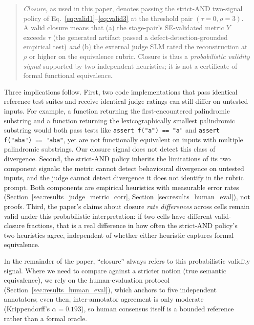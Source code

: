 \begin{quote}
\emph{Closure}, as used in this paper, denotes passing the strict-AND two-signal policy of Eq.~\ref{eq:valid1}--\ref{eq:valid3} at the threshold pair $(\tau = 0, \rho = 3)$. A valid closure means that (a) the stage-pair's SE-validated metric $Y$ exceeds $\tau$ (the generated artifact passed a defect-detection-grounded empirical test) \emph{and} (b) the external judge SLM rated the reconstruction at $\rho$ or higher on the equivalence rubric. Closure is thus a \emph{probabilistic validity signal} supported by two independent heuristics; it is not a certificate of formal functional equivalence.
\end{quote}

Three implications follow. First, two code implementations that pass identical reference test suites and receive identical judge ratings can still differ on untested inputs. For example, a function returning the first-encountered palindromic substring and a function returning the lexicographically smallest palindromic substring would both pass tests like \texttt{assert f("a") == "a"} and \texttt{assert f("aba") == "aba"}, yet are not functionally equivalent on inputs with multiple palindromic substrings. Our closure signal does not detect this class of divergence. Second, the strict-AND policy inherits the limitations of its two component signals: the metric cannot detect behavioural divergence on untested inputs, and the judge cannot detect divergence it does not identify in the rubric prompt. Both components are empirical heuristics with measurable error rates (Section~\ref{sec:results_judge_metric_corr}, Section~\ref{sec:results_human_eval}), not proofs. Third, the paper's claims about closure \emph{rate differences} across cells remain valid under this probabilistic interpretation: if two cells have different valid-closure fractions, that is a real difference in how often the strict-AND policy's two heuristics agree, independent of whether either heuristic captures formal equivalence.

In the remainder of the paper, ``closure'' always refers to this probabilistic validity signal. Where we need to compare against a stricter notion (true semantic equivalence), we rely on the human-evaluation protocol (Section~\ref{sec:results_human_eval}), which anchors to five independent annotators; even then, inter-annotator agreement is only moderate (Krippendorff's $\alpha = 0.193$), so human consensus itself is a bounded reference rather than a formal oracle.

